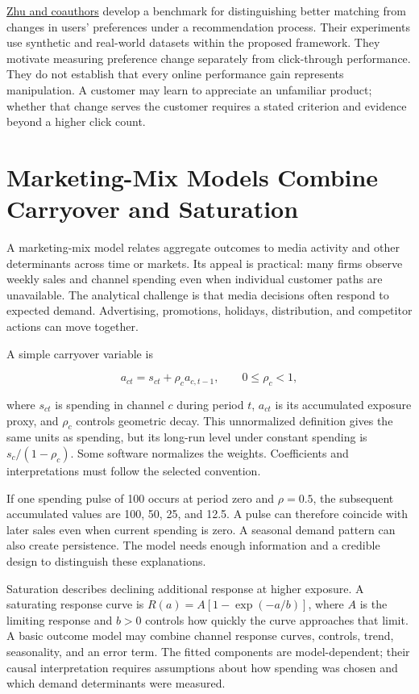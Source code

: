 \href{https://arxiv.org/abs/2210.05662v2}{Zhu and coauthors} develop a
benchmark for distinguishing better matching from changes in users'
preferences under a recommendation process. Their experiments use
synthetic and real-world datasets within the proposed framework. They
motivate measuring preference change separately from click-through
performance. They do not establish that every online performance gain
represents manipulation. A customer may learn to appreciate an
unfamiliar product; whether that change serves the customer requires a
stated criterion and evidence beyond a higher click count.

\hypertarget{M08-marketing-mix-models-combine-carryover-and-saturation}{%
\section{Marketing-Mix Models Combine Carryover and
Saturation}\label{M08-marketing-mix-models-combine-carryover-and-saturation}}

\noindent A marketing-mix model relates aggregate outcomes to media activity and
other determinants across time or markets. Its appeal is practical: many
firms observe weekly sales and channel spending even when individual
customer paths are unavailable. The analytical challenge is that media
decisions often respond to expected demand. Advertising, promotions,
holidays, distribution, and competitor actions can move together.

A simple carryover variable is

\[
a_{ct}=s_{ct}+\rho_c a_{c,t-1},\qquad 0\leq\rho_c<1,
\]

where \(s_{ct}\) is spending in channel \(c\) during period \(t\),
\(a_{ct}\) is its accumulated exposure proxy, and \(\rho_c\) controls
geometric decay. This unnormalized definition gives the same units as
spending, but its long-run level under constant spending is
\(s_c/(1-\rho_c)\). Some software normalizes the weights. Coefficients
and interpretations must follow the selected convention.

If one spending pulse of 100 occurs at period zero and \(\rho=0.5\), the
subsequent accumulated values are 100, 50, 25, and 12.5. A pulse can
therefore coincide with later sales even when current spending is zero.
A seasonal demand pattern can also create persistence. The model needs
enough information and a credible design to distinguish these
explanations.

Saturation describes declining additional response at higher exposure. A
saturating response curve is \(R(a)=A[1-\exp(-a/b)]\), where \(A\) is
the limiting response and \(b>0\) controls how quickly the curve
approaches that limit. A basic outcome model may combine channel
response curves, controls, trend, seasonality, and an error term. The
fitted components are model-dependent; their causal interpretation
requires assumptions about how spending was chosen and which demand
determinants were measured.

